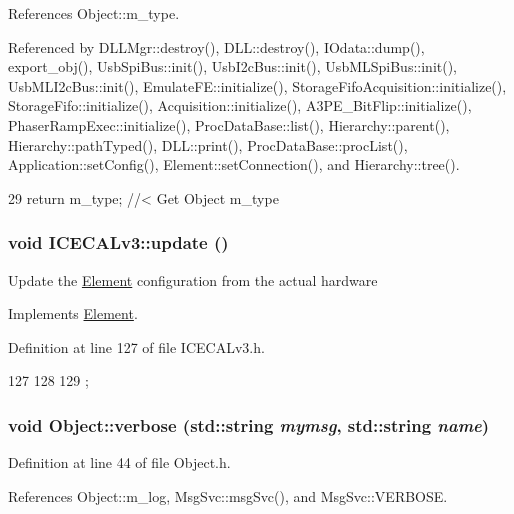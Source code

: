 References Object::m\_\-type.

Referenced by DLLMgr::destroy(), DLL::destroy(), IOdata::dump(), export\_\-obj(), UsbSpiBus::init(), UsbI2cBus::init(), UsbMLSpiBus::init(), UsbMLI2cBus::init(), EmulateFE::initialize(), StorageFifoAcquisition::initialize(), StorageFifo::initialize(), Acquisition::initialize(), A3PE\_\-BitFlip::initialize(), PhaserRampExec::initialize(), ProcDataBase::list(), Hierarchy::parent(), Hierarchy::pathTyped(), DLL::print(), ProcDataBase::procList(), Application::setConfig(), Element::setConnection(), and Hierarchy::tree().


\begin{DoxyCode}
29 { return m_type;       } //< Get Object m_type
\end{DoxyCode}
\hypertarget{classICECALv3_ab2a00809e9a4f2ab83ef041a886ca637}{
\subsubsection[{update}]{\setlength{\rightskip}{0pt plus 5cm}void ICECALv3::update ()}}
\label{classICECALv3_ab2a00809e9a4f2ab83ef041a886ca637}
Update the \hyperlink{classElement}{Element} configuration from the actual hardware 

Implements \hyperlink{classElement_a4e6c83efae95616ebddd03c793a26661}{Element}.

Definition at line 127 of file ICECALv3.h.


\begin{DoxyCode}
127                  {
128     
129   };
\end{DoxyCode}
\hypertarget{classObject_a2d4120195317e2a3c6532e8bb9f3da68}{
\subsubsection[{verbose}]{\setlength{\rightskip}{0pt plus 5cm}void Object::verbose (std::string {\em mymsg}, \/  std::string {\em name})}}
\label{classObject_a2d4120195317e2a3c6532e8bb9f3da68}


Definition at line 44 of file Object.h.

References Object::m\_\-log, MsgSvc::msgSvc(), and MsgSvc::VERBOSE.


